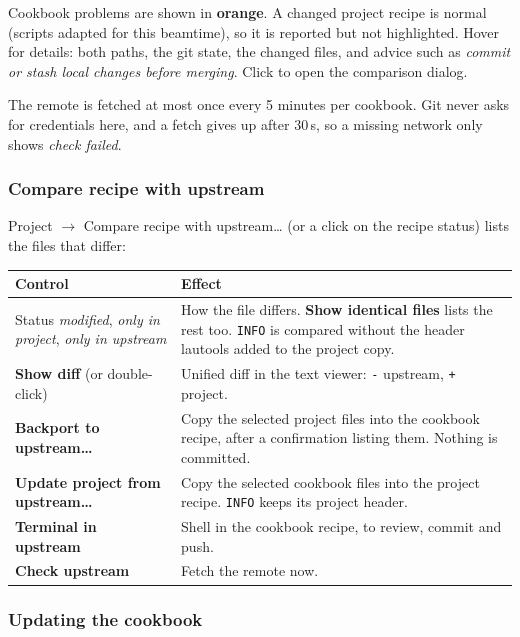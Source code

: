 \documentclass[11pt,a4paper]{article}
\newcommand{\cmd}[1]{\texttt{#1}}
\newcommand{\ui}[1]{\textsf{\textbf{#1}}}
\newcommand{\menu}[1]{\textsf{#1}}
\begin{document}
Cookbook problems are shown in \textcolor{orange!80!black}{\textbf{orange}}. A changed project
recipe is normal (scripts adapted for this beamtime), so it is reported but not highlighted.
Hover for details: both paths, the git state, the changed files, and advice such as
\emph{commit or stash local changes before merging}. Click to open the comparison dialog.

The remote is fetched at most once every 5 minutes per cookbook. Git never asks for credentials
here, and a fetch gives up after 30\,s, so a missing network only shows \emph{check failed}.

\subsubsection*{Compare recipe with upstream}

\menu{Project $\rightarrow$ Compare recipe with upstream\ldots} (or a click on the recipe status)
lists the files that differ:

\begin{center}
\begin{tabularx}{\linewidth}{@{}l>{\raggedright\arraybackslash}X@{}}
\toprule
Control & Effect \\
\midrule
Status \emph{modified}, \emph{only in project}, \emph{only in upstream} & How the file differs. \ui{Show identical files} lists the rest too. \cmd{INFO} is compared without the header lautools added to the project copy. \\
\ui{Show diff} (or double-click) & Unified diff in the text viewer: \cmd{-} upstream, \cmd{+} project. \\
\ui{Backport to upstream\ldots} & Copy the selected project files into the cookbook recipe, after a confirmation listing them. Nothing is committed. \\
\ui{Update project from upstream\ldots} & Copy the selected cookbook files into the project recipe. \cmd{INFO} keeps its project header. \\
\ui{Terminal in upstream} & Shell in the cookbook recipe, to review, commit and push. \\
\ui{Check upstream} & Fetch the remote now. \\
\bottomrule
\end{tabularx}
\end{center}

\subsubsection*{Updating the cookbook}
\end{document}
